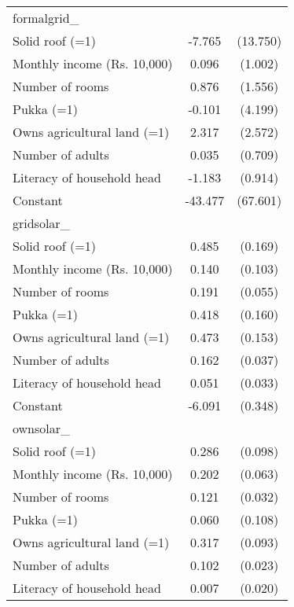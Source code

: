 \begin{table}[htbp]
{\begin{tabular}{l*{1}{cc}}
\midrule
formalgrid\_         &                     &            \\
Solid roof (=1)     &      -7.765         &    (13.750)\\
Monthly income (Rs. 10,000)&       0.096         &     (1.002)\\
Number of rooms     &       0.876         &     (1.556)\\
Pukka (=1)          &      -0.101         &     (4.199)\\
Owns agricultural land (=1)&       2.317         &     (2.572)\\
Number of adults    &       0.035         &     (0.709)\\
Literacy of household head&      -1.183         &     (0.914)\\
Constant            &     -43.477         &    (67.601)\\
\midrule
gridsolar\_          &                     &            \\
Solid roof (=1)     &       0.485\sym{***}&     (0.169)\\
Monthly income (Rs. 10,000)&       0.140         &     (0.103)\\
Number of rooms     &       0.191\sym{***}&     (0.055)\\
Pukka (=1)          &       0.418\sym{***}&     (0.160)\\
Owns agricultural land (=1)&       0.473\sym{***}&     (0.153)\\
Number of adults    &       0.162\sym{***}&     (0.037)\\
Literacy of household head&       0.051         &     (0.033)\\
Constant            &      -6.091\sym{***}&     (0.348)\\
\midrule
ownsolar\_           &                     &            \\
Solid roof (=1)     &       0.286\sym{***}&     (0.098)\\
Monthly income (Rs. 10,000)&       0.202\sym{***}&     (0.063)\\
Number of rooms     &       0.121\sym{***}&     (0.032)\\
Pukka (=1)          &       0.060         &     (0.108)\\
Owns agricultural land (=1)&       0.317\sym{***}&     (0.093)\\
Number of adults    &       0.102\sym{***}&     (0.023)\\
Literacy of household head&       0.007         &     (0.020)\\

\end{tabular}}
\end{table}
